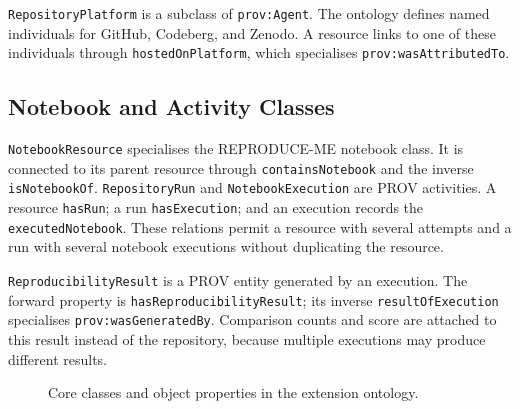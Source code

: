 \texttt{RepositoryPlatform} is a subclass of \texttt{prov:Agent}. The ontology defines named individuals for GitHub, Codeberg, and Zenodo. A resource links to one of these individuals through \texttt{hostedOnPlatform}, which specialises \texttt{prov:wasAttributedTo}.

\subsection{Notebook and Activity Classes}

\texttt{NotebookResource} specialises the REPRODUCE-ME notebook class. It is connected to its parent resource through \texttt{containsNotebook} and the inverse \texttt{isNotebookOf}. \texttt{RepositoryRun} and \texttt{NotebookExecution} are PROV activities. A resource \texttt{hasRun}; a run \texttt{hasExecution}; and an execution records the \texttt{executedNotebook}. These relations permit a resource with several attempts and a run with several notebook executions without duplicating the resource.

\texttt{ReproducibilityResult} is a PROV entity generated by an execution. The forward property is \texttt{hasReproducibilityResult}; its inverse \texttt{resultOfExecution} specialises \texttt{prov:wasGeneratedBy}. Comparison counts and score are attached to this result instead of the repository, because multiple executions may produce different results.

\begin{figure}[ht]
\centering
{}
\caption{Core classes and object properties in the extension ontology.}
\label{fig:ontology-core}
\end{figure}

